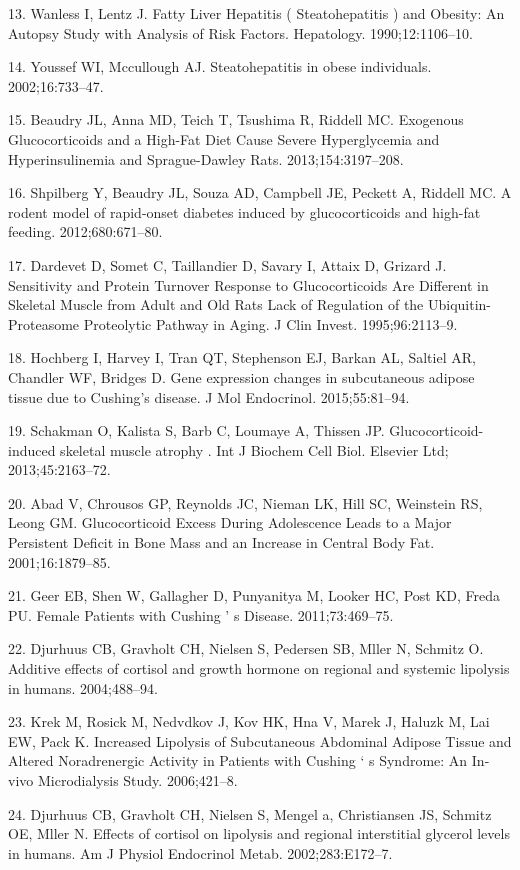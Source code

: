 \documentclass[11pt]{article} %
\begin{document}
13. Wanless I, Lentz J. Fatty Liver Hepatitis ( Steatohepatitis ) and
Obesity: An Autopsy Study with Analysis of Risk Factors. Hepatology.
1990;12:1106--10.

14. Youssef WI, Mccullough AJ. Steatohepatitis in obese individuals.
2002;16:733--47.

15. Beaudry JL, Anna MD, Teich T, Tsushima R, Riddell MC. Exogenous
Glucocorticoids and a High-Fat Diet Cause Severe Hyperglycemia and
Hyperinsulinemia and Sprague-Dawley Rats. 2013;154:3197--208.

16. Shpilberg Y, Beaudry JL, Souza AD, Campbell JE, Peckett A, Riddell
MC. A rodent model of rapid-onset diabetes induced by glucocorticoids
and high-fat feeding. 2012;680:671--80.

17. Dardevet D, Somet C, Taillandier D, Savary I, Attaix D, Grizard J.
Sensitivity and Protein Turnover Response to Glucocorticoids Are
Different in Skeletal Muscle from Adult and Old Rats Lack of Regulation
of the Ubiquitin-Proteasome Proteolytic Pathway in Aging. J Clin Invest.
1995;96:2113--9.

18. Hochberg I, Harvey I, Tran QT, Stephenson EJ, Barkan AL, Saltiel AR,
Chandler WF, Bridges D. Gene expression changes in subcutaneous adipose
tissue due to Cushing's disease. J Mol Endocrinol. 2015;55:81--94.

19. Schakman O, Kalista S, Barb C, Loumaye A, Thissen JP.
Glucocorticoid-induced skeletal muscle atrophy . Int J Biochem Cell
Biol. Elsevier Ltd; 2013;45:2163--72.

20. Abad V, Chrousos GP, Reynolds JC, Nieman LK, Hill SC, Weinstein RS,
Leong GM. Glucocorticoid Excess During Adolescence Leads to a Major
Persistent Deficit in Bone Mass and an Increase in Central Body Fat.
2001;16:1879--85.

21. Geer EB, Shen W, Gallagher D, Punyanitya M, Looker HC, Post KD,
Freda PU. Female Patients with Cushing ' s Disease. 2011;73:469--75.

22. Djurhuus CB, Gravholt CH, Nielsen S, Pedersen SB, Mller N, Schmitz
O. Additive effects of cortisol and growth hormone on regional and
systemic lipolysis in humans. 2004;488--94.

23. Krek M, Rosick M, Nedvdkov J, Kov HK, Hna V, Marek J, Haluzk
M, Lai EW, Pack K. Increased Lipolysis of Subcutaneous Abdominal
Adipose Tissue and Altered Noradrenergic Activity in Patients with
Cushing ` s Syndrome: An In-vivo Microdialysis Study. 2006;421--8.

24. Djurhuus CB, Gravholt CH, Nielsen S, Mengel a, Christiansen JS,
Schmitz OE, Mller N. Effects of cortisol on lipolysis and regional
interstitial glycerol levels in humans. Am J Physiol Endocrinol Metab.
2002;283:E172--7.
\end{document}
